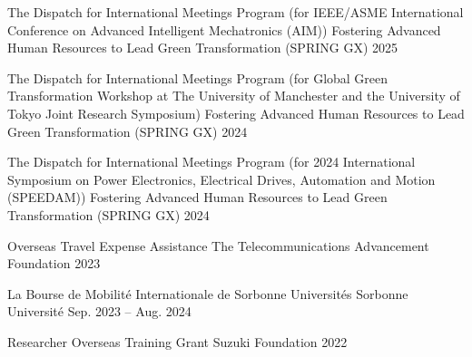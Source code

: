 \filbreak
{}
\begin{cvhonors}

  \cvhonor
    {The Dispatch for International Meetings Program (for IEEE/ASME International Conference on Advanced Intelligent Mechatronics (AIM))} %
    {Fostering Advanced Human Resources to Lead Green Transformation (SPRING GX)} %
    {} %
    {2025} %

  \cvhonor
    {The Dispatch for International Meetings Program (for Global Green Transformation Workshop at The University of Manchester and the University of Tokyo Joint Research Symposium)} %
    {Fostering Advanced Human Resources to Lead Green Transformation (SPRING GX)} %
    {} %
    {2024} %

  \cvhonor
    {The Dispatch for International Meetings Program (for 2024 International Symposium on Power Electronics, Electrical Drives, Automation and Motion (SPEEDAM))} %
    {Fostering Advanced Human Resources to Lead Green Transformation (SPRING GX)} %
    {} %
    {2024} %

  \cvhonor
    {Overseas Travel Expense Assistance} %
    {The Telecommunications Advancement Foundation} %
    {} %
    {2023} %

  \cvhonor
    {La Bourse de Mobilité Internationale de Sorbonne Universités} %
    {Sorbonne Université} %
    {} %
    {Sep. 2023 -- Aug. 2024} %

  \cvhonor
    {Researcher Overseas Training Grant} %
    {Suzuki Foundation} %
    {} %
    {2022} %

\end{cvhonors}